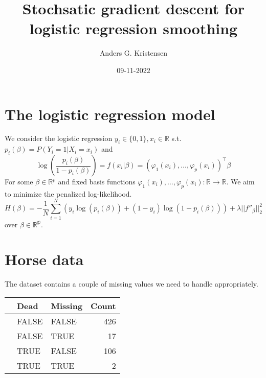\documentclass[a4paper, 11 pt]{article}
\title{Stochsatic gradient descent for logistic regression smoothing}
\author{Anders G. Kristensen}
\date{09-11-2022}
\begin{document}
\maketitle
\section{The logistic regression model}
\noindent We consider the logistic regression $y_i\in\{0,1\}, x_i\in\mathbb{R}$ s.t. $p_i(\beta) = P(Y_i = 1| X_i = x_i)$ and
\[
    \log\left(\frac{p_i(\beta)}{1-p_i(\beta)}\right) = f(x_i|\beta) = \left(\varphi_1(x_i), \dots, \varphi_p(x_i)\right)^\top\beta    
\] 
For some $\beta\in\mathbb{R}^p$ and fixed basis functions $\varphi_1(x_i), \dots, \varphi_p(x_i) : \mathbb{R} \to \mathbb{R}$. We aim to minimize the penalized log-likelihood.
\[
    H(\beta) = -\frac{1}{N}\sum_{i = 1}^N \left(y_i\log(p_i(\beta))+(1-y_i)\log(1-p_i(\beta))\right) + \lambda||f''_\beta||_2^2 
\]
over $\beta\in\mathbb{R^p}$.
\section{Horse data}
The dataset contains a couple of missing values we need to handle appropriately.
\begin{table}[ht]
    \centering
    \begin{tabular}{rllr}
      \hline
     & Dead & Missing & Count \\ 
      \hline
    & FALSE & FALSE & 426 \\ 
    & FALSE & TRUE &  17 \\ 
    & TRUE & FALSE & 106 \\ 
    & TRUE & TRUE &   2 \\ 
       \hline
    \end{tabular}
    \end{table}
\end{document}

